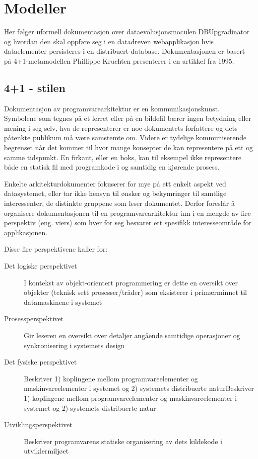 \section{Modeller}

Her følger uformell dokumentasjon over dataevolusjonsmoculen DBUpgradinator og hvordan den skal oppføre seg i en datadreven webapplikasjon hvis dataelementer persisteres i en distribuert database. Dokumentasjonen er basert på 4+1-metamodellen Phillippe Kruchten presenterer i en artikkel fra 1995.

\subsection{4+1 - stilen}

Dokumentasjon av programvarearkitektur er en kommunikasjonskunst. Symbolene som tegnes på et lerret eller på en bildefil bærer ingen betydning eller mening i seg selv, hva de representerer er noe dokumentets forfattere og dets påtenkte publikum må være samstemte om. Videre er tydelige kommuniserende begrenset når det kommer til hvor mange konsepter de kan representere på ett og samme tidspunkt. En firkant, eller en boks, kan til eksempel ikke representere både en statisk fil med programkode i og samtidig en kjørende prosess.

Enkelte arkitekturdokumenter fokuserer for mye på ett enkelt aspekt ved datasystemet, eller tar ikke hensyn til ønsker og bekymringer til samtlige interessenter, de distinkte gruppene som leser dokumentet. Derfor foreslår \cite{kruchten1995} å organisere dokumentasjonen til en programvarearkitektur inn i en mengde av fire perspektiv (eng. viers) som hver for seg besvarer ett spesifikk interesseområde for applikasjonen.

Disse fire perspektivene kaller \cite{kruchten1995} for:
\begin{description}
  \item [Det logiske perspektivet] I kontekst av objekt-orientert programmering er dette en oversikt over objekter (teknisk sett prosesser/tråder) som eksisterer i primærminnet til datamaskinene i systemet
  \item [Prosessperspektivet] Gir leseren en oversikt over detaljer angående samtidige operasjoner og synkronisering i systemets design
  \item [Det fysiske perspektivet] Beskriver 1) koplingene mellom programvareelementer og maskinvareelementer i systemet og 2) systemets distribuerte naturBeskriver 1) koplingene mellom programvareelementer og maskinvareelementer i systemet og 2) systemets distribuerte natur
  \item [Utviklingsperspektivet] Beskriver programvarens statiske organisering av dets kildekode i utviklermiljøet
\end{description}

